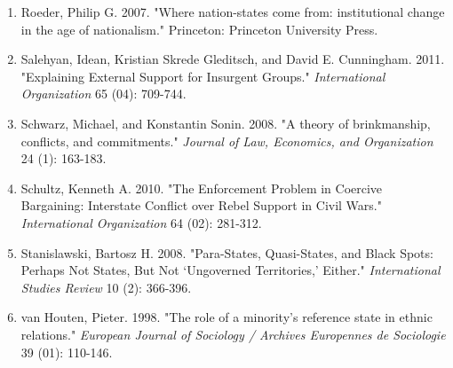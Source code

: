 \documentclass[11pt,letterpaper, notitlepage]{article}
\begin{document}
\begin{enumerate}[1.]
\item \hangindent=1cm Roeder, Philip G. 2007. "Where nation-states come from: institutional change in the age of nationalism." Princeton: Princeton University Press.

\item \hangindent=1cm Salehyan, Idean, Kristian Skrede Gleditsch, and David E. Cunningham. 2011. "Explaining External Support for Insurgent Groups." \emph {International Organization} 65 (04): 709-744.

\item \hangindent=1cm Schwarz, Michael, and Konstantin Sonin. 2008. "A theory of brinkmanship, conflicts, and commitments." \emph{Journal of Law, Economics, and Organization} 24 (1): 163-183.

\item \hangindent=1cm Schultz, Kenneth A. 2010. "The Enforcement Problem in Coercive Bargaining: Interstate Conflict over Rebel Support in Civil Wars." \emph {International Organization} 64 (02): 281-312.




\item \hangindent=1cm Stanislawski, Bartosz H. 2008. "Para-States, Quasi-States, and Black Spots: Perhaps Not States, But Not `Ungoverned Territories,' Either." \emph {International Studies Review} 10 (2): 366-396.


\item \hangindent=1cm van Houten, Pieter. 1998. "The role of a minority's reference state in ethnic relations." \emph {European Journal of Sociology / Archives Europennes de Sociologie} 39 (01): 110-146.


\end{enumerate}
\end{document}
